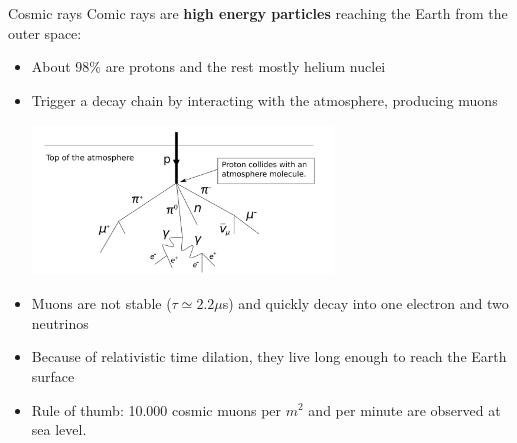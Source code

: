 \documentclass[handout,8 pt]{beamer}
\begin{document}
\begin{frame}{Cosmic rays}
\justifying
Comic rays are \textbf{high energy particles} reaching the Earth from the outer space:
\begin{itemize}
	\justifying
	\item About 98\% are protons and the rest mostly helium nuclei
	\item Trigger a decay chain by interacting with the atmosphere, producing muons

	\begin{minipage}[c]{.98\textwidth}
	\begin{center}
	\includegraphics[width=8cm, height=4cm]{figs/cosmic.png}
	\end{center}
\end{minipage} \hfill 
	
	\item Muons are not stable ($\tau \simeq 2.2\mu$s) and quickly decay into one electron and two neutrinos
	\item Because of relativistic time dilation, they live long enough to reach the Earth surface
	\item Rule of thumb: 10.000 cosmic muons per $m^2$ and per minute are observed at sea level.
\end{itemize} \vfill

\end{frame}
\end{document}
